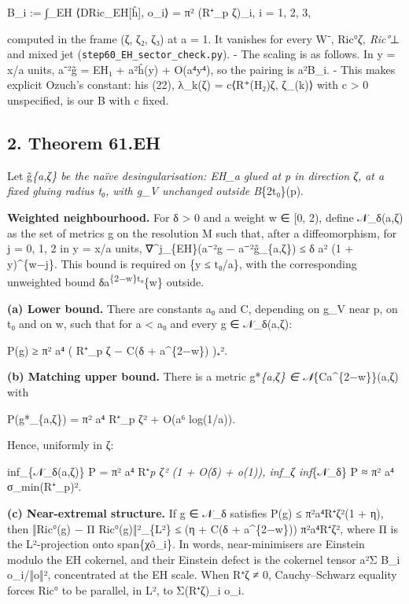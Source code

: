 \documentclass[
  10pt,
]{report}
\begin{document}
B\_i := ∫\_EH ⟨DRic\_EH{[}ĥ{]}, o\_i⟩ = π² (R⁺\_p ζ)\_i, i = 1, 2, 3,

computed in the frame (ζ, ζ₂, ζ₃) at a = 1. It vanishes for every W⁻,
Ric°\emph{ζ, Ric°}⊥ and mixed jet
(\texttt{step60\_EH\_sector\_check.py}). - The scaling is as follows. In
y = x/a units, a⁻²g̃ = EH₁ + a²ĥ(y) + O(a⁴\textbar y\textbar⁴), so the
pairing is a²B\_i. - This makes explicit Ozuch's constant: his (22),
λ\_k(ζ) = c⟨R⁺(H₂)ζ, ζ\_(k)⟩ with c \textgreater{} 0 unspecified, is our
B with c fixed.

\hypertarget{theorem-61.eh}{%
\subsection{2. Theorem 61.EH}\label{theorem-61.eh}}

Let g̃\emph{\{a,ζ\} be the naïve desingularisation: EH\_a glued at p in
direction ζ, at a fixed gluing radius t₀, with g\_V unchanged outside
B}\{2t₀\}(p).

\textbf{Weighted neighbourhood.} For δ \textgreater{} 0 and a weight w ∈
{[}0, 2), define 𝒩\_δ(a,ζ) as the set of metrics g on the resolution M
such that, after a diffeomorphism, for j = 0, 1, 2 in y = x/a units,
\textbar∇\^{}j\_\{EH\}(a⁻²g − a⁻²g̃\_\{a,ζ\})\textbar{} ≤ δ a² (1 +
\textbar y\textbar)\^{}\{w−j\}. This bound is required on
\{\textbar y\textbar{} ≤ t₀/a\}, with the corresponding unweighted bound
δa\textsuperscript{\{2−w\}t₀}\{w\} outside.

\textbf{(a) Lower bound.} There are constants a₀ and C, depending on
g\_V near p, on t₀ and on w, such that for a \textless{} a₀ and every g
∈ 𝒩\_δ(a,ζ):

P(g) ≥ π² a⁴ ( \textbar R⁺\_p ζ\textbar{} − C(δ + a\^{}\{2−w\}) )₊².

\textbf{(b) Matching upper bound.} There is a metric g*\emph{\{a,ζ\} ∈
𝒩}\{Ca\^{}\{2−w\}\}(a,ζ) with

P(g*\_\{a,ζ\}) = π² a⁴ \textbar R⁺\_p ζ\textbar² + O(a⁶ log(1/a)).

Hence, uniformly in ζ:

inf\_\{𝒩\_δ(a,ζ)\} P = π² a⁴ \textbar R⁺\emph{p ζ\textbar² (1 + O(δ) +
o(1)), inf\_ζ inf}\{𝒩\_δ\} P ≈ π² a⁴ σ\_min(R⁺\_p)².

\textbf{(c) Near-extremal structure.} If g ∈ 𝒩\_δ satisfies P(g) ≤
π²a⁴\textbar R⁺ζ\textbar²(1 + η), then ‖Ric°(g) − Π Ric°(g)‖²\_\{L²\} ≤
(η + C(δ + a\^{}\{2−w\})) π²a⁴\textbar R⁺ζ\textbar², where Π is the
L²-projection onto span\{χô\_i\}. In words, near-minimisers are Einstein
modulo the EH cokernel, and their Einstein defect is the cokernel tensor
a²Σ B\_i o\_i/‖o‖², concentrated at the EH scale. When R⁺ζ ≠ 0,
Cauchy--Schwarz equality forces Ric° to be parallel, in L², to Σ(R⁺ζ)\_i
o\_i.
\end{document}
